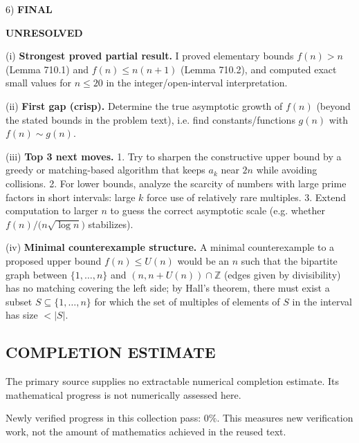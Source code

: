 6) \textbf{FINAL}

\textbf{UNRESOLVED}

(i) \textbf{Strongest proved partial result.}
I proved elementary bounds $f(n)>n$ (Lemma 710.1) and $f(n)\le n(n+1)$ (Lemma 710.2), and computed exact small values for $n\le 20$ in the integer/open-interval interpretation.

(ii) \textbf{First gap (crisp).}
Determine the true asymptotic growth of $f(n)$ (beyond the stated bounds in the problem text), i.e. find constants/functions $g(n)$ with $f(n)\sim g(n)$.

(iii) \textbf{Top 3 next moves.}
1. Try to sharpen the constructive upper bound by a greedy or matching-based algorithm that keeps $a_k$ near $2n$ while avoiding collisions.
2. For lower bounds, analyze the scarcity of numbers with large prime factors in short intervals: large $k$ force use of relatively rare multiples.
3. Extend computation to larger $n$ to guess the correct asymptotic scale (e.g. whether $f(n)/\bigl(n\sqrt{\log n}\bigr)$ stabilizes).

(iv) \textbf{Minimal counterexample structure.}
A minimal counterexample to a proposed upper bound $f(n)\le U(n)$ would be an $n$ such that the bipartite graph between $\{1,\dots,n\}$ and $(n,n+U(n))\cap\mathbb{Z}$ (edges given by divisibility) has no matching covering the left side; by Hall's theorem, there must exist a subset $S\subseteq\{1,\dots,n\}$ for which the set of multiples of elements of $S$ in the interval has size $<|S|$.


\subsection*{COMPLETION ESTIMATE}
The primary source supplies no extractable numerical completion estimate. Its mathematical progress is not numerically assessed here.

Newly verified progress in this collection pass: $0\%$. This measures new verification work, not the amount of mathematics achieved in the reused text.
